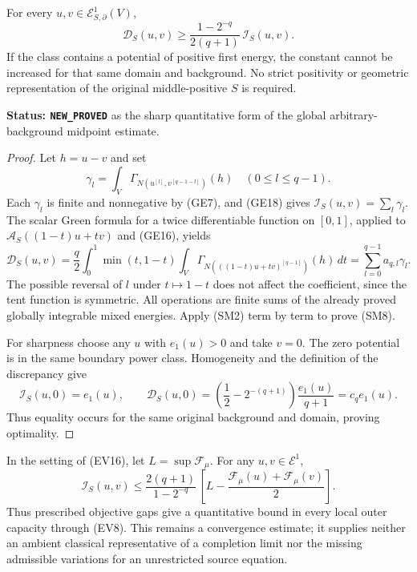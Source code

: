 \begin{theorem}
\label{thm:r11-sharp-midpoint-modulus}
For every $u,v\in\mathcal E^1_{S,\partial}(V)$,
\[
 \boxed{\qquad
       \mathscr D_S(u,v)\geq
          \frac{1-2^{-q}}{2(q+1)}\,\mathscr I_S(u,v).
       \qquad}
 \tag{SM8}
\]
If the class contains a potential of positive first
energy, the constant cannot be increased for that
same domain and background.
No strict positivity or geometric representation of
the original middle-positive $S$ is required.
\end{theorem}

\noindent\textbf{Status: \texttt{NEW\_PROVED}}
as the sharp quantitative form of the global
arbitrary-background midpoint estimate.

\begin{proof}
Let $h=u-v$ and set
\[
 \gamma_l=
       \int_V\Gamma_{N(u^{[l]},v^{[q-1-l]})}(h)
                      \quad(0\leq l\leq q-1).
 \tag{SM9}
\]
Each $\gamma_l$ is finite and nonnegative by (GE7),
and (GE18) gives
$\mathscr I_S(u,v)=\sum_l\gamma_l$.
The scalar Green formula for a twice differentiable
function on $[0,1]$, applied to
$\mathscr A_S((1-t)u+tv)$ and (GE16), yields
\[
 \mathscr D_S(u,v)=
       \frac q2\int_0^1\min(t,1-t)
          \int_V\Gamma_{N(((1-t)u+tv)^{[q-1]})}(h)\,dt
       =\sum_{l=0}^{q-1}a_{q,l}\gamma_l .
 \tag{SM10}
\]
The possible reversal of $l$ under $t\mapsto1-t$
does not affect the coefficient, since the tent
function is symmetric.
All operations are finite sums of the already
proved globally integrable mixed energies.
Apply (SM2) term by term to prove (SM8).

For sharpness choose any $u$ with $e_1(u)>0$ and
take $v=0$.  The zero potential is in the same
boundary power class.  Homogeneity and the definition
of the discrepancy give
\[
 \mathscr I_S(u,0)=e_1(u),\qquad
 \mathscr D_S(u,0)
    =\left(\frac12-2^{-(q+1)}\right)
                       \frac{e_1(u)}{q+1}
    =c_q e_1(u).
 \tag{SM11}
\]
Thus equality occurs for the same original background
and domain, proving optimality.
\end{proof}

\begin{corollary}
\label{cor:r11-sharp-maximizing-error}
In the setting of (EV16), let
$L=\sup\mathcal F_\mu$.
For any $u,v\in\mathcal E^1$,
\[
 \mathscr I_S(u,v)
       \leq \frac{2(q+1)}{1-2^{-q}}\,
                \left[L-\frac{\mathcal F_\mu(u)+\mathcal F_\mu(v)}2\right].
 \tag{SM12}
\]
Thus prescribed objective gaps give a quantitative
bound in every local outer capacity through (EV8).
This remains a convergence estimate; it supplies
neither an ambient classical representative of
a completion limit nor the missing admissible
variations for an unrestricted source equation.
\end{corollary}

